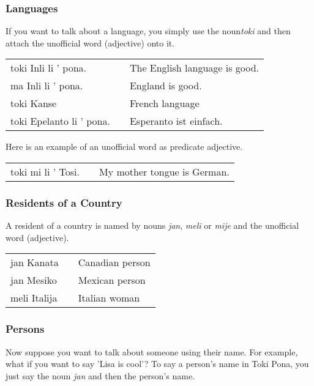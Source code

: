 %
\newpage
\subsubsection*{Languages}
%
If you want to talk about a language, you simply use the noun\textit{toki} and then attach the unofficial word (adjective) onto it. 

\begin{supertabular}{p{5,5cm}|ll}
toki Inli li ' pona. && The English language is good. \\
ma Inli li ' pona. && England is good. \\
toki Kanse && French language \\
toki Epelanto li ' pona. && Esperanto ist einfach. \\
\end{supertabular} 

Here is an example of an unofficial word as predicate adjective.

\begin{supertabular}{p{5,5cm}|ll}
toki mi li ' Tosi. && My mother tongue is German. \\
\end{supertabular}

%
\subsubsection*{Residents of a Country}
%
A resident of a country is named by nouns \textit{jan}, \textit{meli} or \textit{mije} and the unofficial word (adjective).

\begin{supertabular}{p{5,5cm}|ll}
jan Kanata && Canadian person \\
jan Mesiko && Mexican person \\
meli Italija && Italian woman \\
\end{supertabular} 

%
\subsubsection*{Persons}
%
Now suppose you want to talk about someone using their name. 
For example, what if you want to say 'Lisa is cool'? 
To say a person's name in Toki Pona, you just say the noun \textit{jan} and then the person's name. 

